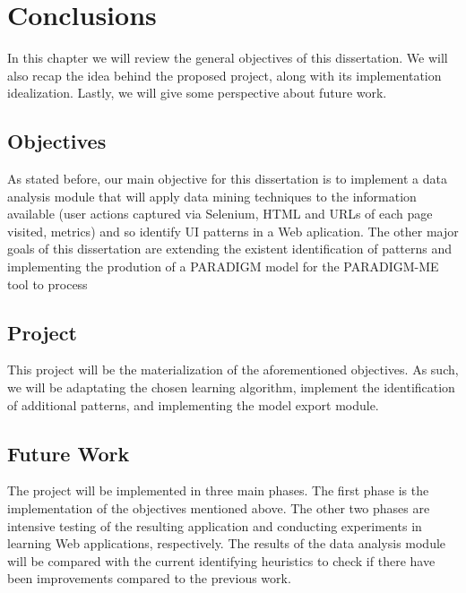 \chapter{Conclusions}\label{chap:conclusions}

In this chapter we will review the general objectives of this dissertation. We will also recap the idea behind the proposed project, along with its implementation idealization. Lastly, we will give some perspective about future work.

\section{Objectives}

As stated before, our main objective for this dissertation is to implement a data analysis module that will apply data mining techniques to the information available (user actions captured via Selenium, HTML and URLs of each page visited, metrics) and so identify UI patterns in a Web aplication. The other major goals of this dissertation are extending the existent identification of patterns and implementing the prodution of a PARADIGM model for the PARADIGM-ME tool to process

\section{Project}

This project will be the materialization of the aforementioned objectives. As such, we will be adaptating the chosen learning algorithm, implement the identification of additional patterns, and implementing the model export module. 

\section{Future Work}

The project will be implemented in three main phases. The first phase is the implementation of the objectives mentioned above. The other two phases are intensive testing of the resulting application and conducting experiments in learning Web applications, respectively. The results of the data analysis module will be compared with the current identifying heuristics to check if there have been improvements compared to the previous work.
